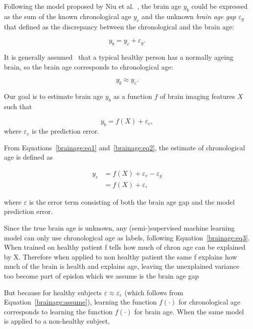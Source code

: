 Following the model proposed by Niu et al.~\cite{niu2019improved}, the brain age $y_b$ could be expressed as the sum of the known chronological age $y_c$ and the unknown \textit{brain age gap} $\varepsilon_g$ that defined as the discrepancy between the chronological and the brain age:

\begin{equation}
    \label{brainage:eq1}
    y_b = y_c + \varepsilon_g.
\end{equation}

It is generally assumed~\cite{franke2019ten} that a typical healthy person has a normally ageing brain, so the brain age corresponds to chronological age:

\begin{equation}
    \label{brainage:assume}
    y_b \approx y_c.
\end{equation}

Our goal is to estimate brain age $y_b$ as a function $f$ of brain imaging features $X$ such that

\begin{equation}
    \label{brainage:eq2}
    y_b = f(X) + \varepsilon_e,
\end{equation}
where $\varepsilon_e$ is the prediction error.

From Equations~\eqref{brainage:eq1} and~\eqref{brainage:eq2}, the estimate of chronological age is defined as

\begin{align}
    y_c &= f(X) + \varepsilon_e - \varepsilon_g \\
        \label{brainage:eq3}
        &= f(X) + \varepsilon,
\end{align}

where $\varepsilon$ is the error term consisting of both the brain age gap and the model prediction error.

Since the true brain age is unknown, any (semi-)supervised machine learning model can only use chronological age as labels, following Equation~\eqref{brainage:eq3}. When trained on healthy patient f tells how much of chron age can be explained by X. Therefore when applied to non healthy patient the same f explains how much of the brain is health and explains age, leaving the unexplained variance too become part of epislon which we assume is the brain age gap



But because for healthy subjects $\varepsilon \approx \varepsilon_e$ (which follows from Equation~\eqref{brainage:assume}), learning the function $f(\cdot)$ for chronological age corresponds to learning the function $f(\cdot)$ for brain age. When the same model is applied to a non-healthy subject, 


